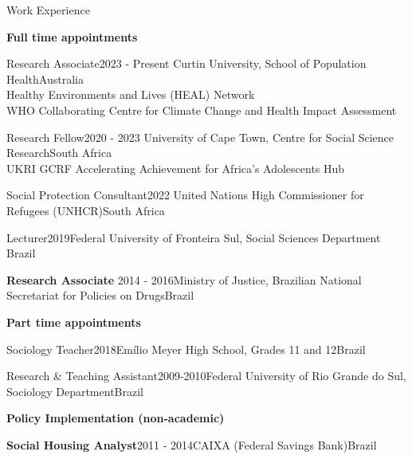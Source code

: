 \begin{rSection}{Work Experience}

\large \diamondsep{} \textbf {Full time appointments}

\begin{rSubsection}
{Research Associate}{2023 - Present}
{Curtin University, School of Population Health}{Australia}\\
Healthy Environments and Lives (HEAL) Network\\
WHO Collaborating Centre for Climate Change and Health Impact Assessment
\end{rSubsection}

\begin{rSubsection}
{Research Fellow}{2020 - 2023}
{University of Cape Town, Centre for Social Science Research}{South Africa}\\
UKRI GCRF Accelerating Achievement for Africa's Adolescents Hub
\end{rSubsection}

\begin{rSubsection}
{Social Protection Consultant}{2022}
{United Nations High Commissioner for Refugees (UNHCR)}{South Africa}\par
\end{rSubsection}

\begin{rSubsection}{Lecturer}{2019}{Federal University of Fronteira Sul, Social Sciences Department} {Brazil}\par
\end{rSubsection}

\begin{rSubsection}{\textbf{Research Associate}}{ 2014 - 2016}{Ministry of Justice, Brazilian National Secretariat for Policies on Drugs}{Brazil}\par
\end{rSubsection}

\vspace{1em}
\large \diamondsep{} \textbf {Part time appointments}
\par

\begin{rSubsection}{Sociology Teacher}{2018}{Emílio Meyer High School, Grades 11 and 12}{Brazil}\par
\end{rSubsection}

\begin{rSubsection}{Research \& Teaching Assistant}{2009-2010}{Federal University of Rio Grande do Sul, Sociology Department}{Brazil}\par
\end{rSubsection}

\vspace{1em}
\large  \diamondsep{}\textbf{Policy Implementation (non-academic)}
\par

\begin{rSubsection}{\textbf{Social Housing Analyst}}{2011 -  2014}{CAIXA (Federal Savings Bank)}{Brazil}\par
\end{rSubsection}

\end{rSection}